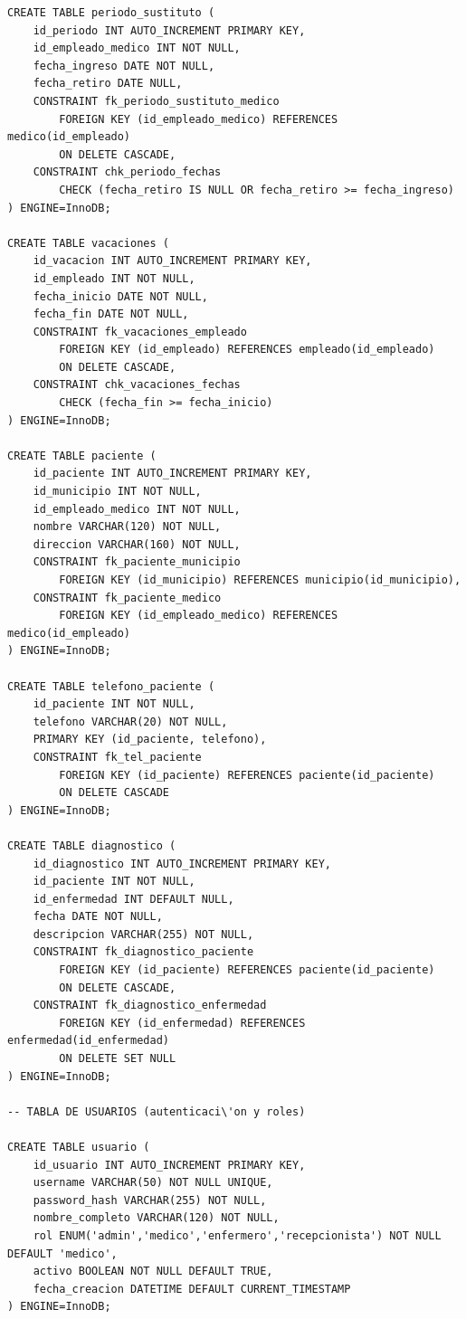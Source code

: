 \documentclass[12pt,a4paper]{article}
\begin{document}
{\begin{verbatim}
CREATE TABLE periodo_sustituto (
    id_periodo INT AUTO_INCREMENT PRIMARY KEY,
    id_empleado_medico INT NOT NULL,
    fecha_ingreso DATE NOT NULL,
    fecha_retiro DATE NULL,
    CONSTRAINT fk_periodo_sustituto_medico
        FOREIGN KEY (id_empleado_medico) REFERENCES medico(id_empleado)
        ON DELETE CASCADE,
    CONSTRAINT chk_periodo_fechas
        CHECK (fecha_retiro IS NULL OR fecha_retiro >= fecha_ingreso)
) ENGINE=InnoDB;

CREATE TABLE vacaciones (
    id_vacacion INT AUTO_INCREMENT PRIMARY KEY,
    id_empleado INT NOT NULL,
    fecha_inicio DATE NOT NULL,
    fecha_fin DATE NOT NULL,
    CONSTRAINT fk_vacaciones_empleado
        FOREIGN KEY (id_empleado) REFERENCES empleado(id_empleado)
        ON DELETE CASCADE,
    CONSTRAINT chk_vacaciones_fechas
        CHECK (fecha_fin >= fecha_inicio)
) ENGINE=InnoDB;

CREATE TABLE paciente (
    id_paciente INT AUTO_INCREMENT PRIMARY KEY,
    id_municipio INT NOT NULL,
    id_empleado_medico INT NOT NULL,
    nombre VARCHAR(120) NOT NULL,
    direccion VARCHAR(160) NOT NULL,
    CONSTRAINT fk_paciente_municipio
        FOREIGN KEY (id_municipio) REFERENCES municipio(id_municipio),
    CONSTRAINT fk_paciente_medico
        FOREIGN KEY (id_empleado_medico) REFERENCES medico(id_empleado)
) ENGINE=InnoDB;

CREATE TABLE telefono_paciente (
    id_paciente INT NOT NULL,
    telefono VARCHAR(20) NOT NULL,
    PRIMARY KEY (id_paciente, telefono),
    CONSTRAINT fk_tel_paciente
        FOREIGN KEY (id_paciente) REFERENCES paciente(id_paciente)
        ON DELETE CASCADE
) ENGINE=InnoDB;

CREATE TABLE diagnostico (
    id_diagnostico INT AUTO_INCREMENT PRIMARY KEY,
    id_paciente INT NOT NULL,
    id_enfermedad INT DEFAULT NULL,
    fecha DATE NOT NULL,
    descripcion VARCHAR(255) NOT NULL,
    CONSTRAINT fk_diagnostico_paciente
        FOREIGN KEY (id_paciente) REFERENCES paciente(id_paciente)
        ON DELETE CASCADE,
    CONSTRAINT fk_diagnostico_enfermedad
        FOREIGN KEY (id_enfermedad) REFERENCES enfermedad(id_enfermedad)
        ON DELETE SET NULL
) ENGINE=InnoDB;

-- TABLA DE USUARIOS (autenticaci\'on y roles)

CREATE TABLE usuario (
    id_usuario INT AUTO_INCREMENT PRIMARY KEY,
    username VARCHAR(50) NOT NULL UNIQUE,
    password_hash VARCHAR(255) NOT NULL,
    nombre_completo VARCHAR(120) NOT NULL,
    rol ENUM('admin','medico','enfermero','recepcionista') NOT NULL DEFAULT 'medico',
    activo BOOLEAN NOT NULL DEFAULT TRUE,
    fecha_creacion DATETIME DEFAULT CURRENT_TIMESTAMP
) ENGINE=InnoDB;


\end{verbatim}}
\end{document}

